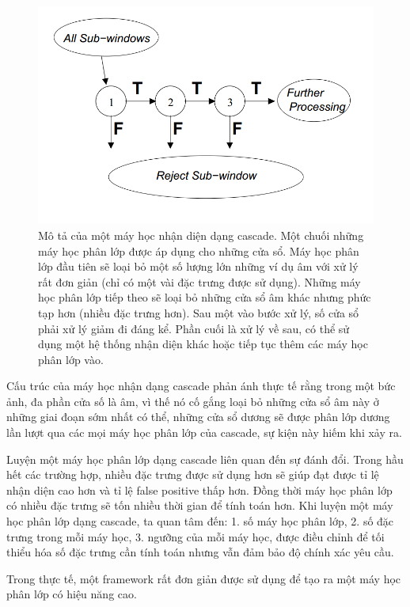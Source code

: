 \documentclass[14pt, oneside, a4paper, openany]{scrartcl}
\begin{document}
\begin{figure}[!h]
	\centering
	\includegraphics[scale=0.5]{figures/cascadeDetection.png} 
	\caption[Mô tả của một máy học nhận diện dạng cascade]{Mô tả của một máy học nhận diện dạng cascade. Một chuối những máy học phân lớp được áp dụng cho những cửa sổ. Máy học phân lớp đầu tiên sẽ loại bỏ một số lượng lớn những ví dụ âm với xử lý rất đơn giản (chỉ có một vài đặc trưng được sử dụng). Những máy học phân lớp tiếp theo sẽ loại bỏ những cửa sổ âm khác nhưng phức tạp hơn (nhiều đặc trưng hơn). Sau một vào bước xử lý, số cửa sổ phải xử lý giảm đi đáng kể. Phần cuối là xử lý về sau, có thể sử dụng một hệ thống nhận diện khác hoặc tiếp tục thêm các máy học phân lớp vào.}
\end{figure}
Cấu trúc của máy học nhận dạng cascade phản ánh thực tế rằng trong một bức ảnh, đa phần cửa số là âm, vì thế nó cố gắng loại bỏ những cửa sổ âm này ở những giai đoạn sớm nhất có thể, những cửa sổ dương sẽ được phân lớp dương lần lượt qua các mọi máy học phân lớp của cascade, sự kiện này hiếm khi xảy ra.

Luyện một máy học phân lớp dạng cascade liên quan đến sự đánh đổi. Trong hầu hết các trường hợp, nhiều đặc trưng được sử dụng hơn sẽ giúp đạt được tỉ lệ nhận diện cao hơn và tỉ lệ false positive thấp hơn. Đồng thời máy học phân lớp có nhiều đặc trưng sẽ tốn nhiều thời gian để tính toán hơn. Khi luyện một máy học phân lớp dạng cascade, ta quan tâm đến: 1. số máy học phân lớp, 2. số đặc trưng trong mỗi máy học, 3. ngưỡng của mỗi máy học, được điều chỉnh để tối thiểu hóa số đặc trưng cần tính toán nhưng vẫn đảm bảo độ chính xác yêu cầu.

Trong thực tế, một framework rất đơn giản được sử dụng để tạo ra một máy học phân lớp có hiệu năng cao. %
\end{document}
